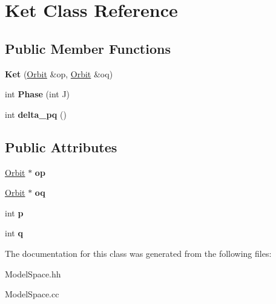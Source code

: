 \hypertarget{classKet}{}\section{Ket Class Reference}
\label{classKet}
\subsection*{Public Member Functions}
\begin{DoxyCompactItemize}
\item 
{\bfseries Ket} (\hyperlink{classOrbit}{Orbit} \&op, \hyperlink{classOrbit}{Orbit} \&oq)\hypertarget{classKet_acbf992b0310758f890a6a0ae659c1a46}{}\label{classKet_acbf992b0310758f890a6a0ae659c1a46}

\item 
int {\bfseries Phase} (int J)\hypertarget{classKet_ac07bfbc7c7f2bdf77341ba6d54036e8e}{}\label{classKet_ac07bfbc7c7f2bdf77341ba6d54036e8e}

\item 
int {\bfseries delta\+\_\+pq} ()\hypertarget{classKet_ac91fa789aa9e8043da735332b9db3e58}{}\label{classKet_ac91fa789aa9e8043da735332b9db3e58}

\end{DoxyCompactItemize}
\subsection*{Public Attributes}
\begin{DoxyCompactItemize}
\item 
\hyperlink{classOrbit}{Orbit} $\ast$ {\bfseries op}\hypertarget{classKet_a9210bf82629ea07996f3b895bc54ba4d}{}\label{classKet_a9210bf82629ea07996f3b895bc54ba4d}

\item 
\hyperlink{classOrbit}{Orbit} $\ast$ {\bfseries oq}\hypertarget{classKet_aa509bf4e812f84bb4c81b00a10d9e82f}{}\label{classKet_aa509bf4e812f84bb4c81b00a10d9e82f}

\item 
int {\bfseries p}\hypertarget{classKet_a3120fbd6d28583a0e06d6426e0e69c83}{}\label{classKet_a3120fbd6d28583a0e06d6426e0e69c83}

\item 
int {\bfseries q}\hypertarget{classKet_afd050bca27dacccd2637266804b4d710}{}\label{classKet_afd050bca27dacccd2637266804b4d710}

\end{DoxyCompactItemize}


The documentation for this class was generated from the following files\+:\begin{DoxyCompactItemize}
\item 
Model\+Space.\+hh\item 
Model\+Space.\+cc\end{DoxyCompactItemize}
